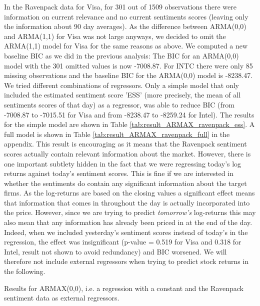 In the Ravenpack data for Visa, for 301 out of 1509 observations there were information on current relevance and no current sentiments scores (leaving only the information about 90 day averages). As the difference between ARMA(0,0) and ARMA(1,1) for Visa was not large anyways, we decided to omit the ARMA(1,1) model for Visa for the same reasons as above. We computed a new baseline BIC as we did in the previous analysis: The BIC for an ARMA(0,0) model with the 301 omitted values is now -7008.87. For INTC there were only 85 missing observations and the baseline BIC for the ARMA(0,0) model is -8238.47. We tried different combinations of regressors. Only a simple model that only included the estimated sentiment score 'ESS' (more precisely, the mean of all sentiments scores of that day) as a regressor, was able to reduce BIC (from -7008.87 to -7015.51 for Visa and from -8238.47 to -8259.24 for Intel). The results for the simple model are shown in Table \ref{tab:result_ARMAX_ravenpack_ess}. A full model is shown in Table \ref{tab:result_ARMAX_ravenpack_full} in the appendix. This result is encouraging as it means that the Ravenpack sentiment scores actually contain relevant information about the market. However, there is one important subtlety hidden in the fact that we were regressing today's log returns against today's sentiment scores. This is fine if we are interested in whether the sentiments do contain any significant information about the target firms. As the log-returns are based on the closing values a significant effect means that information that comes in throughout the day is actually incorporated into the price. However, since we are trying to predict \textit{tomorrow's} log-returns this may also mean that any information has already been priced in at the end of the day. Indeed, when we included yesterday's sentiment scores instead of today's in the regression, the effect was insignificant (p-value = 0.519 for Visa and 0.318 for Intel, result not shown to avoid redundancy) and BIC worsened. We will therefore not include external regressors when trying to predict stock returns in the following. 

\begin{table}[h!]
    \centering
    \vspace{-2ex}
    \small
    
    \vspace{1ex}

    \vspace{-2ex}
    \small
    
    \caption{Results for ARMAX(0,0), i.e. a regression with a constant and the Ravenpack sentiment data as external regressors.}
    \label{tab:result_ARMAX_ravenpack_ess}
\end{table}

